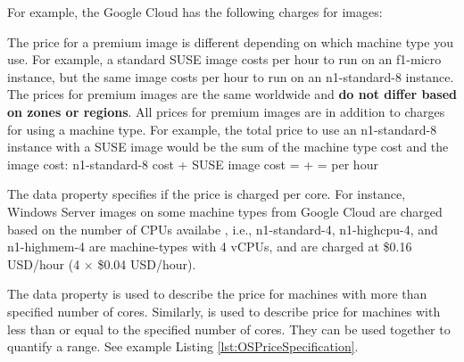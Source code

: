 For example, the Google Cloud has the following charges for images:
\begin{displayquote}
The price for a premium image is different depending on which machine type you use. For example, a standard SUSE image costs  per hour to run on an f1-micro instance, but the same image costs  per hour to run on an n1-standard-8 instance. The prices for premium images are the same worldwide and \textbf{do not differ based on zones or regions}.
All prices for premium images are in addition to charges for using a machine type. For example, the total price to use an n1-standard-8 instance with a SUSE image would be the sum of the machine type cost and the image cost:
n1-standard-8 cost + SUSE image cost =  +  =  per hour
\end{displayquote}

The data property  specifies if the price is charged per core.
For instance, Windows Server images on some machine types from Google Cloud are charged based on the number of CPUs availabe \cite{gcloud_price}, i.e., n1-standard-4, n1-highcpu-4, and n1-highmem-4 are machine-types with 4 vCPUs,
and are charged at \$0.16 USD/hour (4 $\times$ \$0.04 USD/hour).

The data property  is used to describe the price for machines with more than specified number of cores. 
Similarly,  is used to describe price for machines with less than or
equal to the specified number of cores.
They can be used together to quantify a range.
See example Listing \ref{lst:OSPriceSpecification}.

